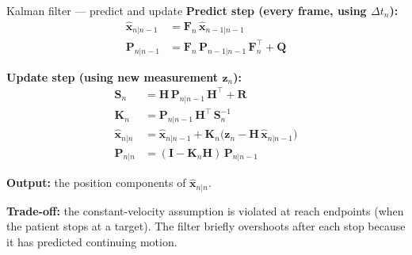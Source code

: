 \documentclass[10pt,aspectratio=169]{beamer}
\begin{document}
\begin{frame}{Kalman filter --- predict and update}
\textbf{Predict step (every frame, using $\Delta t_n$):}
\begin{align*}
\hat{\mathbf{x}}_{n|n-1} &= \mathbf{F}_n \, \hat{\mathbf{x}}_{n-1|n-1} \\
\mathbf{P}_{n|n-1} &= \mathbf{F}_n \, \mathbf{P}_{n-1|n-1} \, \mathbf{F}_n^\top + \mathbf{Q}
\end{align*}

\textbf{Update step (using new measurement $\mathbf{z}_n$):}
\begin{align*}
\mathbf{S}_n &= \mathbf{H} \, \mathbf{P}_{n|n-1} \, \mathbf{H}^\top + \mathbf{R} \\
\mathbf{K}_n &= \mathbf{P}_{n|n-1} \, \mathbf{H}^\top \, \mathbf{S}_n^{-1} \\
\hat{\mathbf{x}}_{n|n} &= \hat{\mathbf{x}}_{n|n-1} + \mathbf{K}_n \bigl(\mathbf{z}_n - \mathbf{H} \, \hat{\mathbf{x}}_{n|n-1}\bigr) \\
\mathbf{P}_{n|n} &= (\mathbf{I} - \mathbf{K}_n \mathbf{H}) \, \mathbf{P}_{n|n-1}
\end{align*}

\textbf{Output:} the position components of $\hat{\mathbf{x}}_{n|n}$.

\textbf{Trade-off:} the constant-velocity assumption is violated at reach endpoints (when the patient stops at a target). The filter briefly overshoots after each stop because it has predicted continuing motion.
\end{frame}
\end{document}
